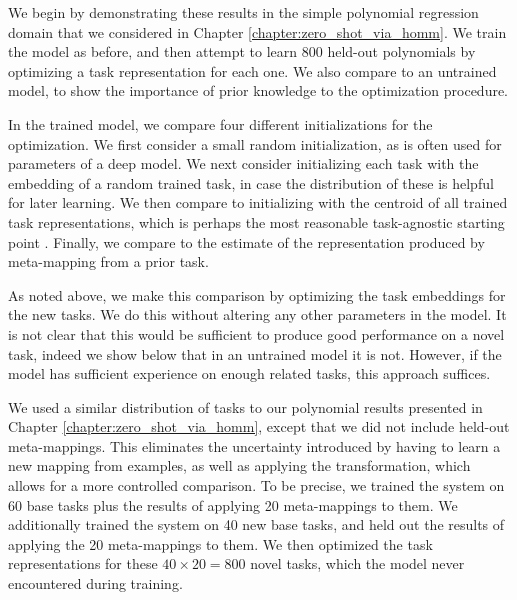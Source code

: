 We begin by demonstrating these results in the simple polynomial regression domain that we considered in Chapter \ref{chapter:zero_shot_via_homm}. We train the model as before, and then attempt to learn 800 held-out polynomials by optimizing a task representation for each one. We also compare to an untrained model, to show the importance of prior knowledge to the optimization procedure. \par
In the trained model, we compare four different initializations for the optimization. We first consider a small random initialization, as is often used for parameters of a deep model. We next consider initializing each task with the embedding of a random trained task, in case the distribution of these is helpful for later learning. We then compare to initializing with the centroid of all trained task representations, which is perhaps the most reasonable task-agnostic starting point \citep[c.f.][]{Lampinen2018a}. Finally, we compare to the estimate of the representation produced by meta-mapping from a prior task. \par 
As noted above, we make this comparison by optimizing the task embeddings for the new tasks. We do this without altering any other parameters in the model. It is not clear that this would be sufficient to produce good performance on a novel task, indeed we show below that in an untrained model it is not. However, if the model has sufficient experience on enough related tasks, this approach suffices. \par 
We used a similar distribution of tasks to our polynomial results presented in Chapter \ref{chapter:zero_shot_via_homm}, except that we did not include held-out meta-mappings. This eliminates the uncertainty introduced by having to learn a new mapping from examples, as well as applying the transformation, which allows for a more controlled comparison. To be precise, we trained the system on 60 base tasks plus the results of applying 20 meta-mappings to them. We additionally trained the system on 40 new base tasks, and held out the results of applying the 20 meta-mappings to them. We then optimized the task representations for these \(40 \times 20 = 800\) novel tasks, which the model never encountered during training. \par 

